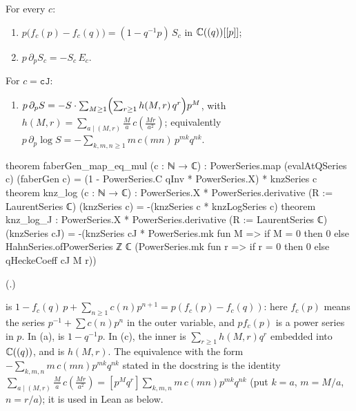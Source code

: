 \begin{theorem}\label{ch19:thm:knzlog}
For every $c$:
\begin{enumerate}[label=(\alph*)]
\item $p\bigl(f_c(p)-f_c(q)\bigr)=(1-q^{-1}p)\,S_c$ in ${\mathbb{C}}((q))[[p]]$;
\item $p\,\partial_pS_c=-S_c\,E_c$.
\end{enumerate}
For $c=\mathtt{cJ}$:
\begin{enumerate}[label=(\alph*),resume]
\item $p\,\partial_pS=-S\cdot\sum_{M\ge1}\Bigl(\sum_{r\ge1}h(M,r)\,q^r\Bigr)p^M$, with $h(M,r)=\sum_{a\mid(M,r)}\frac Ma\,c(\frac{Mr}{a^2})$;
  equivalently $p\,\partial_p\log S=-\sum_{k,m,n\ge1}m\,c(mn)\,p^{mk}q^{nk}$.
\end{enumerate}
\end{theorem}
\begin{leancode}
theorem faberGen_map_eq_mul (c : ℕ → ℂ) :
    PowerSeries.map (evalAtQSeries c) (faberGen c) =
      (1 - PowerSeries.C qInv * PowerSeries.X) * knzSeries c
theorem knz_log (c : ℕ → ℂ) :
    PowerSeries.X * PowerSeries.derivative (R := LaurentSeries ℂ) (knzSeries c) =
      -(knzSeries c * knzLogSeries c)
theorem knz_log_J :
    PowerSeries.X * PowerSeries.derivative (R := LaurentSeries ℂ) (knzSeries cJ) =
      -(knzSeries cJ * PowerSeries.mk fun M => if M = 0 then 0 else
        HahnSeries.ofPowerSeries ℤ ℂ
          (PowerSeries.mk fun r => if r = 0 then 0 else qHeckeCoeff cJ M r))
\end{leancode}
(.)
\begin{dictionary}
 is $1-f_c(q)\,p+\sum_{n\ge1}c(n)p^{n+1}=p(f_c(p)-f_c(q))$: here
$f_c(p)$ means the series $p^{-1}+\sum c(n)p^n$ in the outer variable, and $pf_c(p)$ is a power series in $p$.  In
(a),  is $1-q^{-1}p$.  In (c), the inner 
is $\sum_{r\ge1}h(M,r)q^r$ embedded into ${\mathbb{C}}((q))$, and  is $h(M,r)$.  The equivalence with
the form $-\sum_{k,m,n}m\,c(mn)p^{mk}q^{nk}$ stated in the docstring is the identity
$\sum_{a\mid(M,r)}\frac Ma\,c(\frac{Mr}{a^2})=[p^Mq^r]\sum_{k,m,n}m\,c(mn)p^{mk}q^{nk}$ (put $k=a$, $m=M/a$, $n=r/a$); it is
used in Lean as  below.
\end{dictionary}
